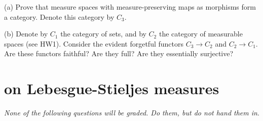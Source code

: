 \documentclass[lang=cn,11pt]{elegantbook}
\begin{document}
(a) Prove that measure spaces with measure-preserving maps as morphisms form a category. Denote this category by \(C_3\).

(b) Denote by \(C_1\) the category of sets, and by \(C_2\) the category of measurable spaces (see HW1). Consider the evident forgetful functors \(C_3 \to C_2\) and \(C_2 \to C_1\). Are these functors faithful? Are they full? Are they essentially surjective?












\chapter{on Lebesgue-Stieljes measures}

\begin{center}
\textit{None of the following questions will be graded. Do them, but do not hand them in}.
\end{center}
\end{document}
